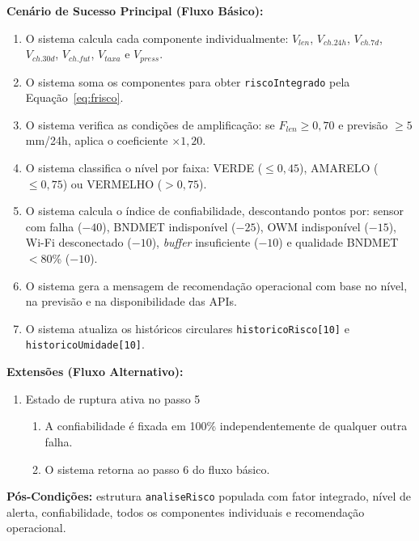 \textbf{Cenário de Sucesso Principal (Fluxo Básico):}
\begin{enumerate}
  \item O sistema calcula cada componente individualmente:
        $V_{len}$, $V_{ch.24h}$, $V_{ch.7d}$, $V_{ch.30d}$,
        $V_{ch.fut}$, $V_{taxa}$ e $V_{press}$.
  \item O sistema soma os componentes para obter
        \texttt{riscoIntegrado} pela Equação~\ref{eq:frisco}.
  \item O sistema verifica as condições de amplificação:
        se $F_{len} \geq 0{,}70$ e previsão $\geq 5$\,mm/24h,
        aplica o coeficiente $\times 1{,}20$.
  \item O sistema classifica o nível por faixa: VERDE
        ($\leq 0{,}45$), AMARELO ($\leq 0{,}75$) ou VERMELHO
        ($> 0{,}75$).
  \item O sistema calcula o índice de confiabilidade,
        descontando pontos por: sensor com falha ($-40$),
        BNDMET indisponível ($-25$), OWM indisponível ($-15$),
        Wi-Fi desconectado ($-10$), \textit{buffer} insuficiente
        ($-10$) e qualidade BNDMET $< 80$\% ($-10$).
  \item O sistema gera a mensagem de recomendação operacional
        com base no nível, na previsão e na disponibilidade
        das APIs.
  \item O sistema atualiza os históricos circulares
        \texttt{historicoRisco[10]} e \\
        \texttt{historicoUmidade[10]}.
\end{enumerate}

\textbf{Extensões (Fluxo Alternativo):}

\begin{enumerate}
  \renewcommand{\theenumi}{5a}
  \renewcommand{\labelenumi}{\theenumi.}
  \item Estado de ruptura ativa no passo 5
  \begin{enumerate}
  \item A confiabilidade é fixada em 100\% independentemente
        de qualquer outra falha.
  \item O sistema retorna ao passo 6 do fluxo básico.
  \end{enumerate}
\end{enumerate}

\textbf{Pós-Condições:} estrutura \texttt{analiseRisco} populada
com fator integrado, nível de alerta, confiabilidade, todos os
componentes individuais e recomendação operacional.

